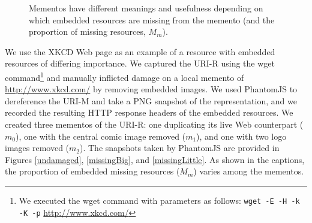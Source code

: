 \begin{figure}[h!t]
\begin{center}
    \qquad
  \end{center}
  \caption{Mementos have different meanings and usefulness depending on which embedded resources are missing from the memento (and the proportion of missing resources, $M_m$).}
  \label{xkcdImgs}
\end{figure}

We use the XKCD Web page as an example of a resource with embedded resources of differing importance. We captured the URI-R using the wget \cite{wget} command\footnote{We executed the wget command with parameters as follows: \texttt{wget -E -H -k -K -p} \url{http://www.xkcd.com/}} and manually inflicted damage on a local memento of \url{http://www.xkcd.com/} by removing embedded images. We used PhantomJS \cite{pjs} to dereference the URI-M and take a PNG snapshot of the representation, and we recorded the resulting HTTP response headers of the embedded resources. We created three mementos of the URI-R: one duplicating its live Web counterpart 
($m_0$), one with the central comic image removed ($m_1$), and one with two logo images removed ($m_2$). The snapshots taken by PhantomJS are provided in Figures \ref{undamaged}, \ref{missingBig}, and \ref{missingLittle}. As shown in the captions, the proportion of embedded missing resources ($M_m$) varies among the mementos.

